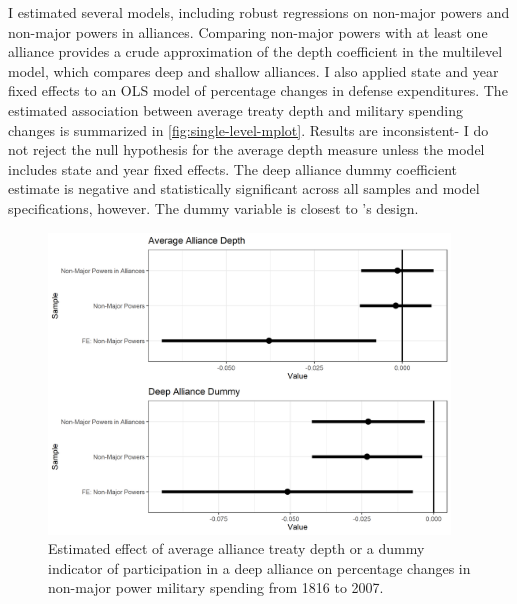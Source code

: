 \documentclass[12pt]{article}
\begin{document}
I estimated several models, including robust regressions on non-major powers and non-major powers in alliances. 
Comparing non-major powers with at least one alliance provides a crude approximation of the depth coefficient in the multilevel model, which compares deep and shallow alliances. 
I also applied state and year fixed effects to an OLS model of percentage changes in defense expenditures. 
The estimated association between average treaty depth and military spending changes is summarized in \autoref{fig:single-level-mplot}. 
Results are inconsistent- I do not reject the null hypothesis for the average depth measure unless the model includes state and year fixed effects. 
The deep alliance dummy coefficient estimate is negative and statistically significant across all samples and model specifications, however. 
The dummy variable is closest to \citet{DigiuseppePoast2016}'s design. 

\begin{figure}[htbp]
	\centering
		\includegraphics[width=0.95\textwidth]{single-level-mplot.png}
	\caption{Estimated effect of average alliance treaty depth or a dummy indicator of participation in a deep alliance on percentage changes in non-major power military spending from 1816 to 2007.}
	\label{fig:single-level-mplot}
\end{figure}
\end{document}
